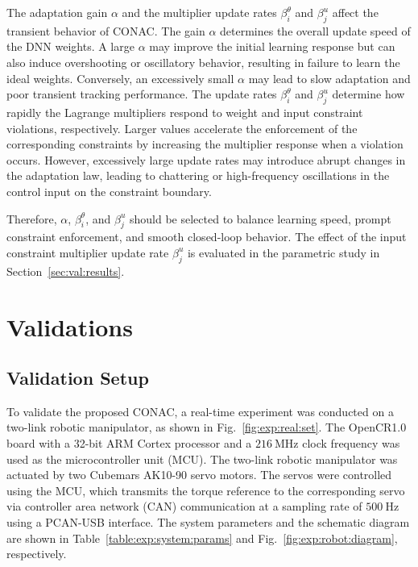 \documentclass[letterpaper, journal, twoside]{IEEEtran}
\begin{document}
\begin{remark} \label{rem:tuning}
  The adaptation gain $\alpha$ and the multiplier update rates $\beta_i^\theta$ and $\beta_j^u$ affect the transient behavior of CONAC.
  The gain $\alpha$ determines the overall update speed of the DNN weights.
  A large $\alpha$ may improve the initial learning response but can also induce overshooting or oscillatory behavior, resulting in failure to learn the ideal weights.
  Conversely, an excessively small $\alpha$ may lead to slow adaptation and poor transient tracking performance.
  The update rates $\beta_i^\theta$ and $\beta_j^u$ determine how rapidly the Lagrange multipliers respond to weight and input constraint violations, respectively.
  Larger values accelerate the enforcement of the corresponding constraints by increasing the multiplier response when a violation occurs.
  However, excessively large update rates may introduce abrupt changes in the adaptation law, leading to chattering or high-frequency oscillations in the control input on the constraint boundary.

  Therefore, $\alpha$, $\beta_i^\theta$, and $\beta_j^u$ should be selected to balance learning speed, prompt constraint enforcement, and smooth closed-loop behavior.
  The effect of the input constraint multiplier update rate $\beta_j^u$ is evaluated in the parametric study in Section~\ref{sec:val:results}.
\end{remark}

\section{Validations} \label{sec:val}

\subsection{Validation Setup} \label{sec:val:setup}

To validate the proposed CONAC, a real-time experiment was conducted on a two-link robotic manipulator, as shown in Fig.~\ref{fig:exp:real:set}. 
The OpenCR1.0 board \cite{opencr} with a 32-bit ARM Cortex processor and a $\qty{216}{\mega\hertz}$ clock frequency was used as the microcontroller unit (MCU).
The two-link robotic manipulator was actuated by two Cubemars AK10-90 servo motors.
The servos were controlled using the MCU, which transmits the torque reference to the corresponding servo via controller area network (CAN) communication at a sampling rate of $\qty{500}{\hertz}$ using a PCAN-USB interface.
The system parameters and the schematic diagram are shown in Table~\ref{table:exp:system:params} and Fig.~\ref{fig:exp:robot:diagram}, respectively.
\end{document}
